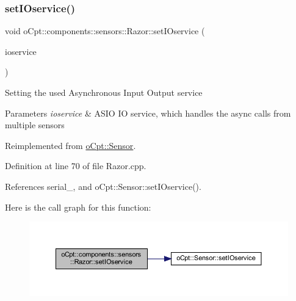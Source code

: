 \subsubsection{\texorpdfstring{set\+I\+Oservice()}{setIOservice()}}
{\footnotesize\ttfamily void o\+Cpt\+::components\+::sensors\+::\+Razor\+::set\+I\+Oservice (\begin{DoxyParamCaption}\item[{boost\+::shared\+\_\+ptr$<$ boost\+::asio\+::io\+\_\+service $>$}]{ioservice }\end{DoxyParamCaption})\hspace{0.3cm}{\ttfamily [virtual]}}

Setting the used Asynchronous Input Output service 
\begin{DoxyParams}{Parameters}
{\em ioservice} & A\+S\+IO IO service, which handles the async calls from multiple sensors \\
\hline
\end{DoxyParams}


Reimplemented from \hyperlink{classo_cpt_1_1_sensor_ae7d47e18df5eb7854bf71fbbee9568df}{o\+Cpt\+::\+Sensor}.



Definition at line 70 of file Razor.\+cpp.



References serial\+\_\+, and o\+Cpt\+::\+Sensor\+::set\+I\+Oservice().

Here is the call graph for this function\+:
\nopagebreak
\begin{figure}[H]
\begin{center}
\leavevmode
\includegraphics[width=350pt]{classo_cpt_1_1components_1_1sensors_1_1_razor_a0f251fe3b51bf1a96b5d1e14e69a6d57_cgraph}
\end{center}
\end{figure}
\hypertarget{classo_cpt_1_1components_1_1sensors_1_1_razor_a25a3159510e0b725eaf817b8775420ac}{}\label{classo_cpt_1_1components_1_1sensors_1_1_razor_a25a3159510e0b725eaf817b8775420ac} 

